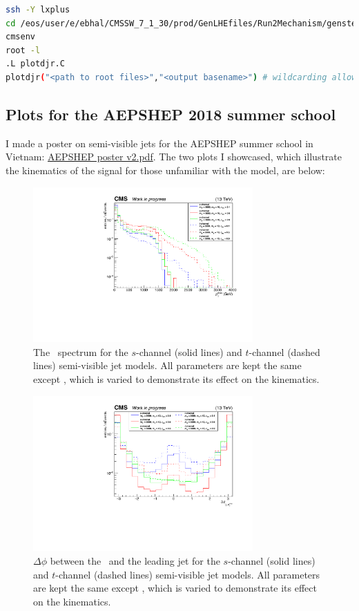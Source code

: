 \begin{lstlisting}[belowskip=-0.7cm, language=sh, numbers=none]
ssh -Y lxplus
cd /eos/user/e/ebhal/CMSSW_7_1_30/prod/GenLHEfiles/Run2Mechanism/genstep
cmsenv
root -l
.L plotdjr.C
plotdjr("<path to root files>","<output basename>") # wildcarding allowed for root files
\end{lstlisting}


\subsection{Plots for the AEPSHEP 2018 summer school}

I made a poster on semi-visible jets for the AEPSHEP summer school in Vietnam: \href{run:./sec35/AEPSHEP poster v2.pdf}{AEPSHEP poster v2.pdf}. The two plots I showcased, which illustrate the kinematics of the signal for those unfamiliar with the model, are below:

\begin{figure}[H]
\centering
\includegraphics[width=0.75\textwidth]{./sec35/AEPSHEP/MET.pdf}
\caption{The \ptmiss\ spectrum for the $s$-channel (solid lines) and $t$-channel (dashed lines) semi-visible jet models. All parameters are kept the same except \rinv, which is varied to demonstrate its effect on the kinematics.}
\end{figure}

\begin{figure}[H]
\centering
\includegraphics[width=0.75\textwidth]{./sec35/AEPSHEP/dPhiMetJ.pdf}
\caption{$\Delta\phi$ between the \ptmiss\ and the leading jet for the $s$-channel (solid lines) and $t$-channel (dashed lines) semi-visible jet models. All parameters are kept the same except \rinv, which is varied to demonstrate its effect on the kinematics.}
\end{figure}

